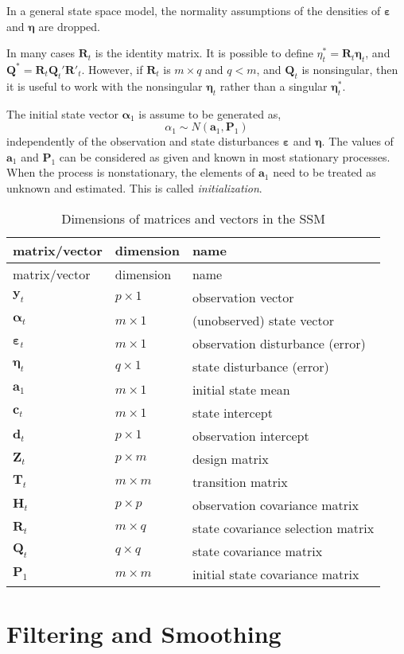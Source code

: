 \documentclass[]{book}
\newcommand{\mat}[1]{\boldsymbol{#1}}
\renewcommand{\vec}[1]{\boldsymbol{#1}}
\begin{document}
In a general state space model, the normality assumptions of the
densities of \(\vec{\varepsilon}\) and \(\vec{\eta}\) are dropped.

In many cases \(\mat{R}_t\) is the identity matrix. It is possible to
define \(\eta^*_t = \mat{R}_t \vec{\eta}_t\), and
\(\mat{Q}^* = \mat{R}_t \mat{Q}_t' \mat{R}'_t\). However, if
\(\mat{R}_t\) is \(m \times q\) and \(q < m\), and \(\mat{Q}_t\) is
nonsingular, then it is useful to work with the nonsingular
\(\vec{\eta}_t\) rather than a singular \(\vec{\eta}_t^*\).

The initial state vector \(\vec{\alpha}_1\) is assume to be generated
as, \[
\alpha_1 \sim N(\vec{a}_1, \mat{P}_1)
\] independently of the observation and state disturbances
\(\vec{\varepsilon}\) and \(\vec{\eta}\). The values of \(\vec{a}_1\)
and \(\mat{P}_1\) can be considered as given and known in most
stationary processes. When the process is nonstationary, the elements of
\(\vec{a}_1\) need to be treated as unknown and estimated. This is
called \emph{initialization}.

\begin{longtable}[c]{@{}lll@{}}
\caption{Dimensions of matrices and vectors in the SSM}\tabularnewline
\toprule
matrix/vector & dimension & name\tabularnewline
\midrule
\endfirsthead
\toprule
matrix/vector & dimension & name\tabularnewline
\midrule
\endhead
\(\vec{y}_t\) & \(p \times 1\) & observation vector\tabularnewline
\(\vec{\alpha}_t\) & \(m \times 1\) & (unobserved) state
vector\tabularnewline
\(\vec{\varepsilon}_t\) & \(m \times 1\) & observation disturbance
(error)\tabularnewline
\(\vec{\eta}_t\) & \(q \times 1\) & state disturbance
(error)\tabularnewline
\(\vec{a}_1\) & \(m \times 1\) & initial state mean\tabularnewline
\(\vec{c}_t\) & \(m \times 1\) & state intercept\tabularnewline
\(\vec{d}_t\) & \(p \times 1\) & observation intercept\tabularnewline
\(\mat{Z}_t\) & \(p \times m\) & design matrix\tabularnewline
\(\mat{T}_t\) & \(m \times m\) & transition matrix\tabularnewline
\(\mat{H}_t\) & \(p \times p\) & observation covariance
matrix\tabularnewline
\(\mat{R}_t\) & \(m \times q\) & state covariance selection
matrix\tabularnewline
\(\mat{Q}_t\) & \(q \times q\) & state covariance matrix\tabularnewline
\(\mat{P}_1\) & \(m \times m\) & initial state covariance
matrix\tabularnewline
\bottomrule
\end{longtable}

\chapter{Filtering and Smoothing}\label{filtering-and-smoothing}
\end{document}
